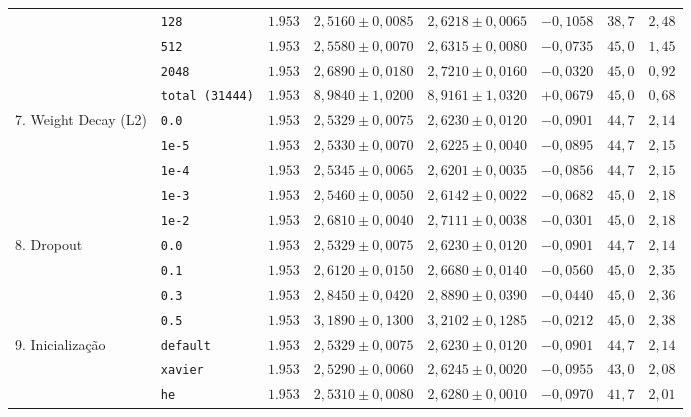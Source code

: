\documentclass[12pt,a4paper]{article}
\begin{document}
\begin{table}[H]
{\begin{tabular}{llcccccc}
 & \texttt{128} & $1.953$ & $2{,}5160 \pm 0{,}0085$ & $2{,}6218 \pm 0{,}0065$ & $-0{,}1058$ & $38{,}7$ & $2{,}48$ \\
 & \texttt{512} & $1.953$ & $2{,}5580 \pm 0{,}0070$ & $2{,}6315 \pm 0{,}0080$ & $-0{,}0735$ & $45{,}0$ & $1{,}45$ \\
 & \texttt{2048} & $1.953$ & $2{,}6890 \pm 0{,}0180$ & $2{,}7210 \pm 0{,}0160$ & $-0{,}0320$ & $45{,}0$ & $0{,}92$ \\
 & \texttt{total (31444)} & $1.953$ & $8{,}9840 \pm 1{,}0200$ & $8{,}9161 \pm 1{,}0320$ & $+0{,}0679$ & $45{,}0$ & $0{,}68$ \\
\midrule
\multirow{5}{*}{7. Weight Decay (L2)} 
 & \texttt{0.0} & $1.953$ & $2{,}5329 \pm 0{,}0075$ & $2{,}6230 \pm 0{,}0120$ & $-0{,}0901$ & $44{,}7$ & $2{,}14$ \\
 & \texttt{1e-5} & $1.953$ & $2{,}5330 \pm 0{,}0070$ & $2{,}6225 \pm 0{,}0040$ & $-0{,}0895$ & $44{,}7$ & $2{,}15$ \\
 & \texttt{1e-4} & $1.953$ & $2{,}5345 \pm 0{,}0065$ & $2{,}6201 \pm 0{,}0035$ & $-0{,}0856$ & $44{,}7$ & $2{,}15$ \\
 & \texttt{1e-3} & $1.953$ & $2{,}5460 \pm 0{,}0050$ & $2{,}6142 \pm 0{,}0022$ & $-0{,}0682$ & $45{,}0$ & $2{,}18$ \\
 & \texttt{1e-2} & $1.953$ & $2{,}6810 \pm 0{,}0040$ & $2{,}7111 \pm 0{,}0038$ & $-0{,}0301$ & $45{,}0$ & $2{,}18$ \\
\midrule
\multirow{4}{*}{8. Dropout} 
 & \texttt{0.0} & $1.953$ & $2{,}5329 \pm 0{,}0075$ & $2{,}6230 \pm 0{,}0120$ & $-0{,}0901$ & $44{,}7$ & $2{,}14$ \\
 & \texttt{0.1} & $1.953$ & $2{,}6120 \pm 0{,}0150$ & $2{,}6680 \pm 0{,}0140$ & $-0{,}0560$ & $45{,}0$ & $2{,}35$ \\
 & \texttt{0.3} & $1.953$ & $2{,}8450 \pm 0{,}0420$ & $2{,}8890 \pm 0{,}0390$ & $-0{,}0440$ & $45{,}0$ & $2{,}36$ \\
 & \texttt{0.5} & $1.953$ & $3{,}1890 \pm 0{,}1300$ & $3{,}2102 \pm 0{,}1285$ & $-0{,}0212$ & $45{,}0$ & $2{,}38$ \\
\midrule
\multirow{4}{*}{9. Inicialização} 
 & \texttt{default} & $1.953$ & $2{,}5329 \pm 0{,}0075$ & $2{,}6230 \pm 0{,}0120$ & $-0{,}0901$ & $44{,}7$ & $2{,}14$ \\
 & \texttt{xavier} & $1.953$ & $2{,}5290 \pm 0{,}0060$ & $2{,}6245 \pm 0{,}0020$ & $-0{,}0955$ & $43{,}0$ & $2{,}08$ \\
 & \texttt{he} & $1.953$ & $2{,}5310 \pm 0{,}0080$ & $2{,}6280 \pm 0{,}0010$ & $-0{,}0970$ & $41{,}7$ & $2{,}01$ \\

\end{tabular}}
\end{table}
\end{document}
